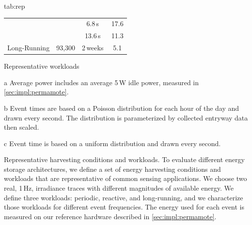 \begin{definetable}{tab:rep}
\begin{threeparttable}
\begin{subtable}{\columnwidth}
\begin{tabular}{r | c | c | c}
                                        &                       & 6.8\,s\,\tnote{b}     &  17.6     \\
                                        &                       & 13.6\,s\,\tnote{b}    &  11.3     \\\hline
                 Long-Running           & 93,300                 & 2\,weeks\,\tnote{c}  &  5.1      \\
            \end{tabular}
            \caption{Representative workloads}
        \end{subtable}
    \end{threeparttable}
    \vspace{-4pt}
    \begin{tablenotes}[para]
    \scriptsize
    \item[a] Average power includes an average 5\,\textmu W idle power, measured in \cref{sec:impl:permamote}.\\
    \item[b] Event times are based on a Poisson distribution for each hour of the day and drawn every second. The distribution is parameterized by collected entryway data then scaled.\\
    \item[c] Event time is based on a uniform distribution and drawn every second.
    \end{tablenotes}
    \caption{\normalfont Representative harvesting conditions and workloads.
    To evaluate different energy storage architectures, we define a set of energy harvesting
    conditions and workloads that are representative of common sensing applications. We choose two
    real, 1\,Hz, irradiance traces with different magnitudes of available energy. We define three
    workloads: periodic, reactive, and long-running, and we characterize those workloads
    for different event frequencies. The energy used for each event is measured
    on our reference hardware described in \cref{sec:impl:permamote}.
    }
\end{definetable}

